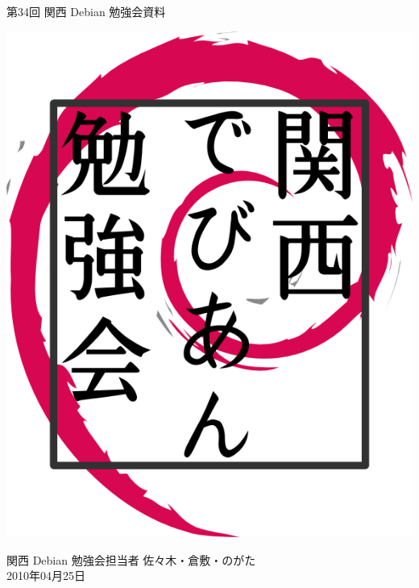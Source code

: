 \documentclass[mingoth,a4paper]{jsarticle}
\newcommand{\debmtgyear}{2010}
\newcommand{\debmtgdate}{25}
\newcommand{\debmtgmonth}{04}
\newcommand{\debmtgnumber}{34}
\begin{document}
\begin{titlepage}


 第\debmtgnumber{}回 関西 Debian 勉強会資料

\vspace{2cm}

\begin{center}
\includegraphics{image200802/kansaidebianlogo.png}
\end{center}

\begin{flushright}
\hfill{}関西 Debian 勉強会担当者 佐々木・倉敷・のがた \\
\hfill{}\debmtgyear{}年\debmtgmonth{}月\debmtgdate{}日
\end{flushright}

\thispagestyle{empty}
\end{titlepage}


\subsection*{}%
 
\end{document}
